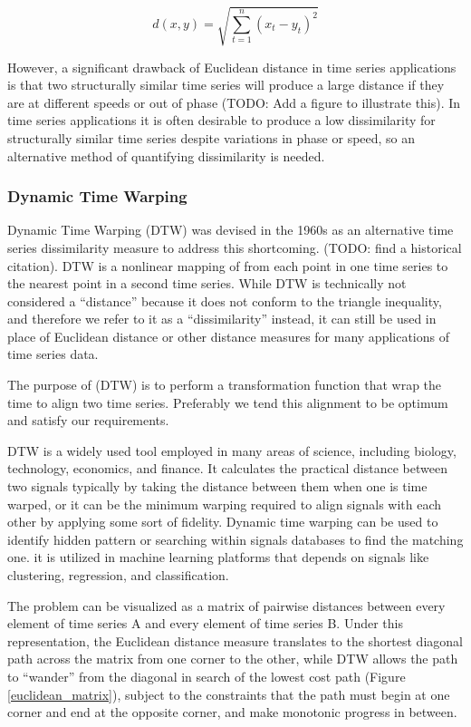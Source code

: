 \documentclass[12pt, letterpaper]{article}
\begin{document}
\begin{equation} \label{euclid}
d(x, y) = \sqrt{\sum_{t=1}^{n}(x_t-y_t)^2}
\end{equation}

However, a significant drawback of Euclidean distance in time series
applications is that two structurally similar time series will produce a large
distance if they are at different speeds or out of phase (TODO: Add a figure to
illustrate this). In time series applications it is often desirable to produce a
low dissimilarity for structurally similar time series despite variations in
phase or speed, so an alternative method of quantifying dissimilarity is needed.

\subsubsection{Dynamic Time Warping}

Dynamic Time Warping (DTW) was devised in the 1960s as an alternative time
series dissimilarity measure to address this shortcoming. (TODO: find a
historical citation). DTW is a nonlinear mapping of from each point in one time
series to the nearest point in a second time series. While DTW is technically
not considered a ``distance'' because it does not conform to the triangle
inequality, and therefore we refer to it as a ``dissimilarity'' instead, it can
still be used in place of Euclidean distance or other distance measures for many
applications of time series data.

The purpose of (DTW) is to perform a transformation
function that wrap the time to align two time series. Preferably we tend this
alignment to be optimum and satisfy our
requirements.\cite{deriso_general_nodate}

DTW is a widely used tool employed in many areas of science, including biology,
technology, economics, and finance. It calculates the practical distance between
two signals typically by taking the distance between them when one is time
warped, or it can be the minimum warping required to align signals with each
other by applying some sort of fidelity.  Dynamic time warping can be used to
identify hidden pattern or searching within signals databases to find the
matching one.\cite{keogh_derivative_2001} it is utilized in machine learning
platforms that depends on signals like clustering, regression, and
classification.

The problem can be visualized as a matrix of pairwise distances between every
element of time series A and every element of time series B. Under this
representation, the Euclidean distance measure translates to the shortest
diagonal path across the matrix from one corner to the other, while DTW allows
the path to ``wander'' from the diagonal in search of the lowest cost path
(Figure \ref{euclidean_matrix}), subject to the constraints that the path must
begin at one corner and end at the opposite corner, and make monotonic progress
in between.
\end{document}
